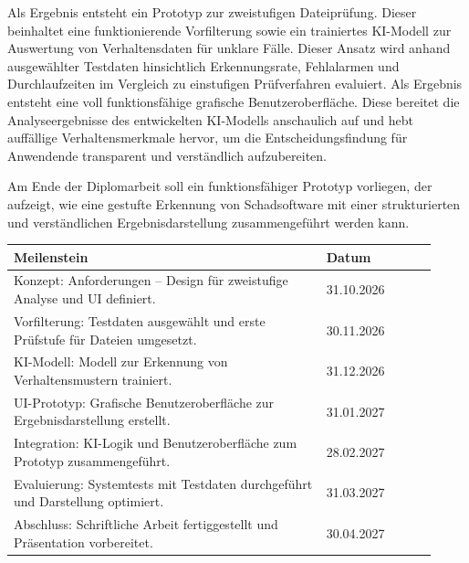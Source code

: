 
Als Ergebnis entsteht ein Prototyp zur zweistufigen Dateiprüfung. Dieser beinhaltet eine funktionierende Vorfilterung sowie ein trainiertes KI-Modell zur Auswertung von Verhaltensdaten für unklare Fälle. Dieser Ansatz wird anhand ausgewählter Testdaten hinsichtlich Erkennungsrate, Fehlalarmen und Durchlaufzeiten im Vergleich zu einstufigen Prüfverfahren evaluiert.
Als Ergebnis entsteht eine voll funktionsfähige grafische Benutzeroberfläche. Diese bereitet die Analyseergebnisse des entwickelten KI-Modells anschaulich auf und hebt auffällige Verhaltensmerkmale hervor, um die Entscheidungsfindung für Anwendende transparent und verständlich aufzubereiten.


Am Ende der Diplomarbeit soll ein funktionsfähiger Prototyp vorliegen, der aufzeigt, wie eine gestufte Erkennung von Schadsoftware mit einer strukturierten und verständlichen Ergebnisdarstellung zusammengeführt werden kann.

\begin{tabular}{@{}p{0.68\linewidth}p{0.24\linewidth}@{}}
    \toprule
    \bfseries Meilenstein & \bfseries Datum \\
    \midrule
    Konzept: Anforderungen -- Design für zweistufige Analyse und UI definiert. & 31.10.2026 \\
    Vorfilterung: Testdaten ausgewählt und erste Prüfstufe für Dateien umgesetzt. & 30.11.2026 \\
    KI-Modell: Modell zur Erkennung von Verhaltensmustern trainiert. & 31.12.2026 \\
    UI-Prototyp: Grafische Benutzeroberfläche zur Ergebnisdarstellung erstellt. & 31.01.2027 \\
    Integration: KI-Logik und Benutzeroberfläche zum Prototyp zusammengeführt. & 28.02.2027 \\
    Evaluierung: Systemtests mit Testdaten durchgeführt und Darstellung optimiert. & 31.03.2027 \\
    Abschluss: Schriftliche Arbeit fertiggestellt und Präsentation vorbereitet. & 30.04.2027 \\
    \bottomrule
\end{tabular}
